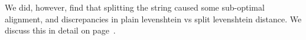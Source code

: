 We did, however, find that splitting the string caused some
sub-optimal alignment, and discrepancies in plain levenshtein vs split
levenshtein distance. We discuss this in detail on
page~\pageref{split-distance-eval}.



